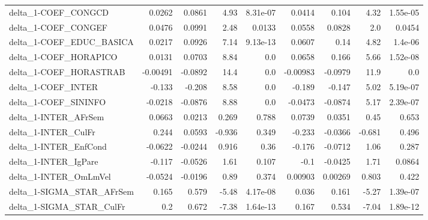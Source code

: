 \begin{tabular}{lrrrrrrrr}
delta\_1-COEF\_CONGCD                   &      0.0262 &       0.0861 &    4.93 & 8.31e-07 &     0.0414 &       0.104 &         4.32 &      1.55e-05 \\
delta\_1-COEF\_CONGEF                   &      0.0476 &       0.0991 &    2.48 &   0.0133 &     0.0558 &      0.0828 &          2.0 &        0.0454 \\
delta\_1-COEF\_EDUC\_BASICA              &      0.0217 &       0.0926 &    7.14 & 9.13e-13 &     0.0607 &        0.14 &         4.82 &       1.4e-06 \\
delta\_1-COEF\_HORAPICO                 &      0.0131 &       0.0703 &    8.84 &      0.0 &     0.0658 &       0.166 &         5.66 &      1.52e-08 \\
delta\_1-COEF\_HORASTRAB                &    -0.00491 &      -0.0892 &    14.4 &      0.0 &   -0.00983 &     -0.0979 &         11.9 &           0.0 \\
delta\_1-COEF\_INTER                    &      -0.133 &       -0.208 &    8.58 &      0.0 &     -0.189 &      -0.147 &         5.02 &      5.19e-07 \\
delta\_1-COEF\_SININFO                  &     -0.0218 &      -0.0876 &    8.88 &      0.0 &    -0.0473 &     -0.0874 &         5.17 &      2.39e-07 \\
delta\_1-INTER\_AFrSem                  &      0.0663 &       0.0213 &   0.269 &    0.788 &     0.0739 &      0.0351 &         0.45 &         0.653 \\
delta\_1-INTER\_CulFr                   &       0.244 &       0.0593 &  -0.936 &    0.349 &     -0.233 &     -0.0366 &       -0.681 &         0.496 \\
delta\_1-INTER\_EnfCond                 &     -0.0622 &      -0.0244 &   0.916 &     0.36 &     -0.176 &     -0.0712 &         1.06 &         0.287 \\
delta\_1-INTER\_IgPare                  &      -0.117 &      -0.0526 &    1.61 &    0.107 &       -0.1 &     -0.0425 &         1.71 &        0.0864 \\
delta\_1-INTER\_OmLmVel                 &     -0.0524 &      -0.0196 &    0.89 &    0.374 &    0.00903 &     0.00269 &        0.803 &         0.422 \\
delta\_1-SIGMA\_STAR\_AFrSem             &       0.165 &        0.579 &   -5.48 & 4.17e-08 &      0.036 &       0.161 &        -5.27 &      1.39e-07 \\
delta\_1-SIGMA\_STAR\_CulFr              &         0.2 &        0.672 &   -7.38 & 1.64e-13 &      0.167 &       0.534 &        -7.04 &      1.89e-12 \\

\end{tabular}
